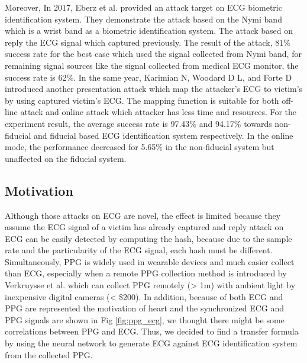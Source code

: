 \documentclass[a4paper,12pt]{article}
\begin{document}
Moreover, In 2017, Eberz et al. \autocite{Eberz:2017broken} provided an attack target on ECG biometric identification system. They demonstrate the attack based on the Nymi band which is a wrist band as a biometric identification system. The attack based on reply the ECG signal which captured previously. The result of the attack, 81\% success rate for the best case which used the signal collected from Nymi band, for remaining signal sources like the signal collected from medical ECG monitor, the success rate is 62\%. In the same year, Karimian N, Woodard D L, and Forte D introduced another presentation attack\parencite{Karimian:2017vulnerability} which map the attacker's ECG to victim's by using captured victim's ECG. The mapping function is suitable for both off-line attack and online attack which attacker has less time and resources. For the experiment result, the average success rate is 97.43\% and 94.17\% towards non-fiducial and fiducial based ECG identification system respectively. In the online mode, the performance decreased for 5.65\% in the non-fiducial system but unaffected on the fiducial system.

\subsection{Motivation}
Although those attacks on ECG are novel, the effect is limited because they assume the ECG signal of a victim has already captured\parencite{Blasco:2018feasibility} and reply attack on ECG can be easily detected by computing the hash, because due to the sample rate and the particularity of the ECG signal, each hash must be different. Simultaneously, PPG is widely used in wearable devices and much easier collect than ECG, especially when a remote PPG collection method is introduced by Verkruysse et al. which can collect PPG remotely (> 1m) with ambient light by inexpensive digital cameras (< \$200)\parencite{Verkruysse2008remotePPG}. In addition, because of both ECG and PPG are represented the motivation of heart and the synchronized ECG and PPG signals are shown in Fig \ref{fig:ppg_ecg}, we thought there might be some correlations between PPG and ECG. Thus, we decided to find a transfer formula by using the neural network to generate ECG against ECG identification system from the collected PPG.
\end{document}
